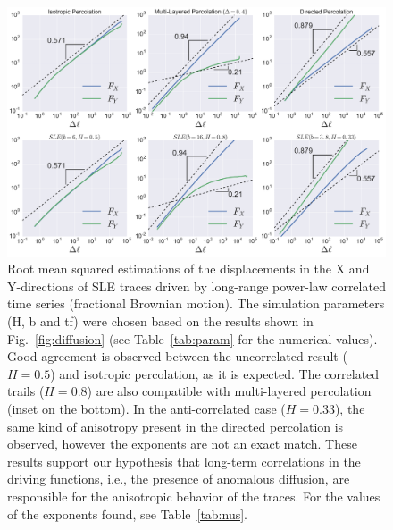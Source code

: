 \begin{figure}
\begin{center}
    \includegraphics[width=\textwidth]{chapters/ch6-asle/figs/spacescaling}
\end{center}
\caption{Root mean squared estimations of the displacements in the X and
    Y-directions of SLE traces driven by long-range power-law correlated time
    series (fractional Brownian motion). The simulation parameters (H, b and
    tf) were chosen based on the results shown in Fig.~\ref{fig:diffusion} (see
    Table~\ref{tab:param} for the numerical values). Good agreement is
    observed between the uncorrelated result ($H=0.5$) and isotropic percolation,
    as it is expected. The correlated trails ($H=0.8$) are also compatible with
    multi-layered percolation (inset on the bottom). In the anti-correlated
    case ($H=0.33$), the same kind of anisotropy present in the directed
    percolation is observed, however the exponents are not an exact match.
    These results support our hypothesis that long-term correlations in the
    driving functions, i.e., the presence of anomalous diffusion, are
    responsible for the anisotropic behavior of the traces. For the values of
    the exponents found, see Table~\ref{tab:nus}.}
\label{fig:spacescaling}
\end{figure}

